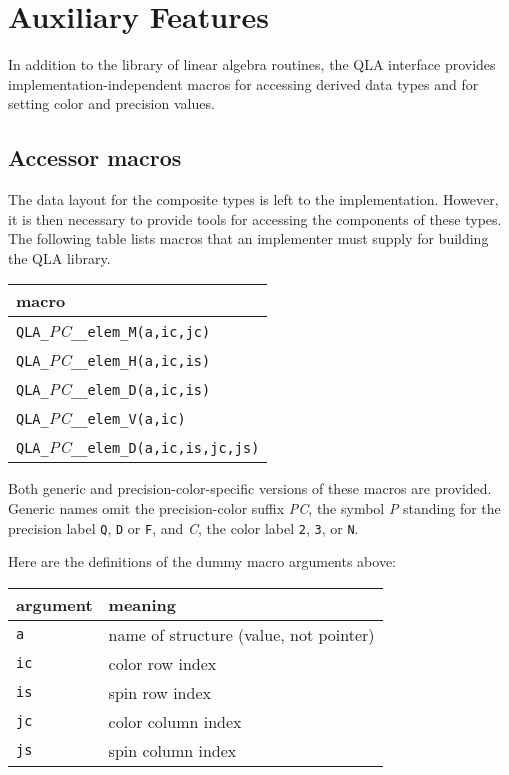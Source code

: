 \documentclass{article}
\newcommand{\ttdash}{{\tt \_}}
\begin{document}
\section{Auxiliary Features}

In addition to the library of linear algebra routines, the QLA
interface provides implementation-independent macros for accessing
derived data types and for setting color and precision values.

\subsection{Accessor macros}

The data layout for the composite types is left to the implementation.
However, it is then necessary to provide tools for accessing the
components of these types.  The following table lists macros that an
implementer must supply for building the QLA library.

\begin{center}
\begin{tabular}{|l|}
\hline
  macro                                       \\
\hline
{\tt QLA}\ttdash{\it PC}\ttdash\ttdash{\tt elem}\ttdash{\tt M}{\tt(a,ic,jc)}                  \\
{\tt QLA}\ttdash{\it PC}\ttdash\ttdash{\tt elem}\ttdash{\tt H}{\tt(a,ic,is)}            \\
{\tt QLA}\ttdash{\it PC}\ttdash\ttdash{\tt elem}\ttdash{\tt D}{\tt(a,ic,is)}           \\
{\tt QLA}\ttdash{\it PC}\ttdash\ttdash{\tt elem}\ttdash{\tt V}{\tt(a,ic)}          \\
{\tt QLA}\ttdash{\it PC}\ttdash\ttdash{\tt elem}\ttdash{\tt D}{\tt(a,ic,is,jc,js)}  \\
\hline
\end{tabular}
\end{center}

Both generic and precision-color-specific versions of these macros are
provided.  Generic names omit the precision-color suffix {\it PC}, the
symbol {\it P} standing for the precision label {\tt Q}, {\tt D} or
{\tt F}, and {\it C}, the color label {\tt 2}, {\tt 3}, or {\tt N}.

Here are the definitions of the dummy macro arguments above:

\begin{center}
\begin{tabular}{|l|l|}
\hline
  argument           & meaning                                 \\
\hline
{\tt a}   & name of structure (value, not pointer) \\
{\tt ic}  & color row index \\
{\tt is}  & spin row index \\
{\tt jc}  & color column index \\
{\tt js}  & spin column index \\
\hline
\end{tabular}
\end{center}
\end{document}
